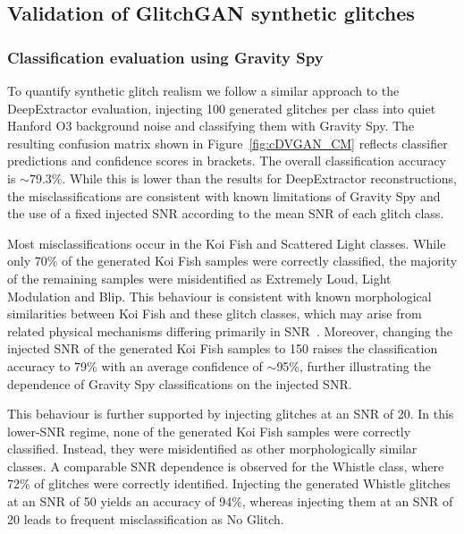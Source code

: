 \documentclass[reprint,nofootinbib,amsmath,amssymb,aps,floatfix]{revtex4-2}
\begin{document}
\subsection{Validation of GlitchGAN synthetic glitches}

\subsubsection{Classification evaluation using Gravity Spy}
\label{sec:GlitchGAN_gspy_eval}
To quantify synthetic glitch realism we follow a similar approach to the DeepExtractor evaluation, injecting 100 generated glitches per class into quiet Hanford O3 background noise and classifying them with Gravity Spy.
The resulting confusion matrix shown in Figure~\ref{fig:cDVGAN_CM} reflects classifier predictions and confidence scores in brackets. The overall classification accuracy is $\sim 79.3\%$.
While this is lower than the results for DeepExtractor reconstructions, the misclassifications are consistent with known limitations of Gravity Spy and the use of a fixed injected SNR according to the mean SNR of each glitch class. 

Most misclassifications occur in the Koi Fish and Scattered Light classes. 
While only 70\% of the generated Koi Fish samples were correctly classified, the majority of the remaining samples were misidentified as Extremely Loud, Light Modulation and Blip.
This behaviour is consistent with known morphological similarities between Koi Fish and these glitch classes, which may arise from related physical mechanisms differing primarily in SNR~\cite{Areeda2017}.
Moreover, changing the injected SNR of the generated Koi Fish samples to 150 raises the classification accuracy to 79\% with an average confidence of $\sim$95\%, further illustrating the dependence of Gravity Spy classifications on the injected SNR.


This behaviour is further supported by injecting glitches at an SNR of 20.
In this lower-SNR regime, none of the generated Koi Fish samples were correctly classified.
Instead, they were misidentified as other morphologically similar classes.
A comparable SNR dependence is observed for the Whistle class, where 72\% of glitches were correctly identified.
Injecting the generated Whistle glitches at an SNR of 50 yields an accuracy of 94\%, whereas injecting them at an SNR of 20 leads to frequent misclassification as No Glitch.
\end{document}
